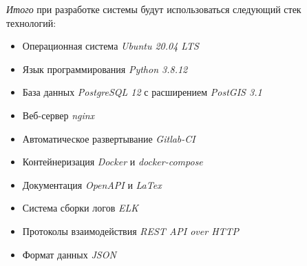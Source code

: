 \noindent \textit{Итого} при разработке системы будут использоваться следующий стек технологий:
\begin{itemize}
    \item Операционная система \textit{Ubuntu 20.04 LTS}
    \item Язык программирования \textit{Python 3.8.12}
    \item База данных \textit{PostgreSQL 12} с расширением \textit{PostGIS 3.1}
    \item Веб-сервер \textit{nginx}
    \item Автоматическое развертывание \textit{Gitlab-CI}
    \item Контейнеризация \textit{Docker} и \textit{docker-compose}
    \item Документация \textit{OpenAPI} и \textit{LaTex}
    \item Система сборки логов \textit{ELK}
    \item Протоколы взаимодействия \textit{REST API over HTTP}
    \item Формат данных \textit{JSON}
\end{itemize}